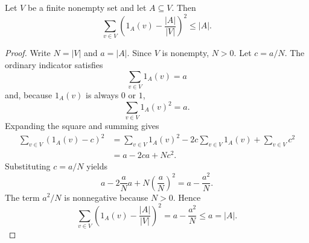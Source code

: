 \begin{helper}
Let \(V\) be a finite nonempty set and let \(A\subseteq V\). Then
\[
  \sum_{v\in V}\left(1_A(v)-\frac{|A|}{|V|}\right)^2\le |A|.
\]
\end{helper}
\begin{proof}
Write \(N=|V|\) and \(a=|A|\). Since \(V\) is nonempty, \(N>0\). Let \(c=a/N\). The ordinary indicator satisfies
\[
  \sum_{v\in V}1_A(v)=a
\]
and, because \(1_A(v)\) is always \(0\) or \(1\),
\[
  \sum_{v\in V}1_A(v)^2=a.
\]
Expanding the square and summing gives
\[
\begin{aligned}
  \sum_{v\in V}(1_A(v)-c)^2
  &= \sum_{v\in V}1_A(v)^2
     -2c\sum_{v\in V}1_A(v)
     +\sum_{v\in V}c^2  \\
  &= a-2c a+Nc^2.
\end{aligned}
\]
Substituting \(c=a/N\) yields
\[
  a-2\frac aN a+N\left(\frac aN\right)^2
  =
  a-\frac{a^2}{N}.
\]
The term \(a^2/N\) is nonnegative because \(N>0\). Hence
\[
  \sum_{v\in V}\left(1_A(v)-\frac{|A|}{|V|}\right)^2
  =a-\frac{a^2}{N}\le a=|A|.
\]
\end{proof}
